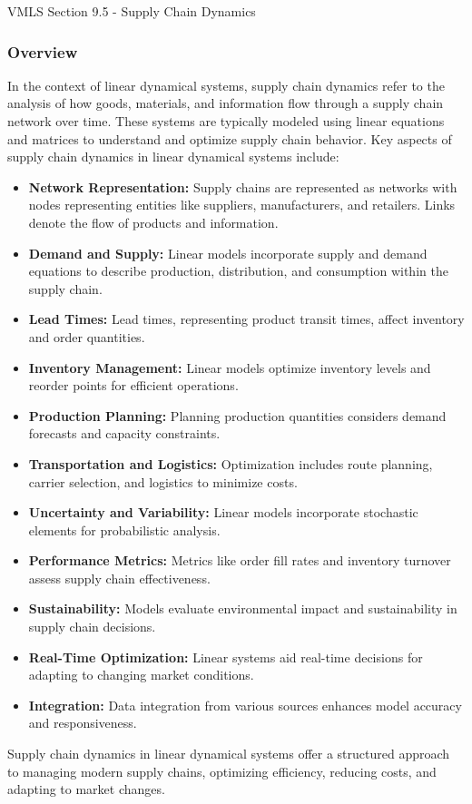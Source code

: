 \begin{notes}{VMLS Section 9.5 - Supply Chain Dynamics}
    \subsubsection*{Overview}

    In the context of linear dynamical systems, supply chain dynamics refer to the analysis of how goods, materials, and information flow through a supply chain network over time. These systems are 
    typically modeled using linear equations and matrices to understand and optimize supply chain behavior. Key aspects of supply chain dynamics in linear dynamical systems include:
    
    \begin{itemize}
        \item \textbf{Network Representation:} Supply chains are represented as networks with nodes representing entities like suppliers, manufacturers, and retailers. Links denote the flow of products 
        and information.
        \item \textbf{Demand and Supply:} Linear models incorporate supply and demand equations to describe production, distribution, and consumption within the supply chain.        
        \item \textbf{Lead Times:} Lead times, representing product transit times, affect inventory and order quantities.        
        \item \textbf{Inventory Management:} Linear models optimize inventory levels and reorder points for efficient operations.        
        \item \textbf{Production Planning:} Planning production quantities considers demand forecasts and capacity constraints.        
        \item \textbf{Transportation and Logistics:} Optimization includes route planning, carrier selection, and logistics to minimize costs.        
        \item \textbf{Uncertainty and Variability:} Linear models incorporate stochastic elements for probabilistic analysis.        
        \item \textbf{Performance Metrics:} Metrics like order fill rates and inventory turnover assess supply chain effectiveness.        
        \item \textbf{Sustainability:} Models evaluate environmental impact and sustainability in supply chain decisions.        
        \item \textbf{Real-Time Optimization:} Linear systems aid real-time decisions for adapting to changing market conditions.        
        \item \textbf{Integration:} Data integration from various sources enhances model accuracy and responsiveness.
    \end{itemize}
    
    Supply chain dynamics in linear dynamical systems offer a structured approach to managing modern supply chains, optimizing efficiency, reducing costs, and adapting to market changes.
\end{notes}